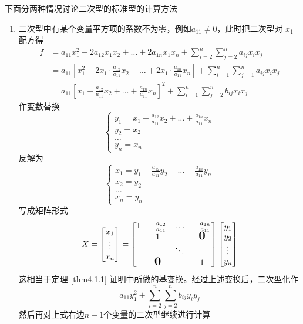 \documentclass[11pt]{article}
\begin{document}
下面分两种情况讨论二次型的标准型的计算方法
\begin{enumerate}
\item 二次型中有某个变量平方项的系数不为零，例如\(a_{11}\neq0\)，此时把二次型对
\(x_1\)配方得
\begin{align*}
f&=a_{11}x_1^2+2a_{12}x_1x_2+\dots+2a_{1n}x_1x_n+\sum_{i=2}^n\sum_{j=2}^n
a_{ij}x_ix_j\\
&=a_{11}\left[x_1^2+2x_1\cdot\frac{a_{12}}{a_{11}}x_2+\dots+
2x_1\cdot \frac{a_{1n}}{a_{11}}x_n
\right]+\sum_{i=1}^n\sum_{j=1}^na_{ij}x_ix_j\\
&=a_{11}\left[
x_1+\frac{a_{12}}{a_{11}}x_2+\dots+\frac{a_{1n}}{a_{11}}x_n
\right]^2+\sum_{i=1}^n\sum_{j=2}^nb_{ij}x_ix_j
\end{align*}
作变数替换
\begin{equation*}
\begin{cases}
y_1=x_1+\frac{a_{12}}{a_{11}}x_2+\dots+\frac{a_{1n}}{a_{11}}x_n\\
y_2=x_2\\
\dots\\
y_n=x_n
\end{cases}
\end{equation*}
反解为
\begin{equation*}
\begin{cases}
x_1=y_1-\frac{a_{12}}{a_{11}}y_2-\dots-\frac{a_{1n}}{a_{11}}y_n\\
x_2=y_2\\
\dots\\
x_n=y_n
\end{cases}
\end{equation*}
写成矩阵形式
\begin{equation*}
X=
\begin{bmatrix}
x_1\\\vdots\\x_n
\end{bmatrix}=
\begin{bmatrix}
1&-\frac{a_{12}}{a_{11}}&\dots&-\frac{a_{1n}}{a_{11}}\\
&1&&\mbox{\normalfont\Large\bfseries 0}\\
&&\ddots&\\
&\mbox{\normalfont\Large\bfseries 0}&&1
\end{bmatrix}
\begin{bmatrix}
y_1\\y_2\\\vdots\\y_n
\end{bmatrix}
\end{equation*}
这相当于定理 \ref{thm4.1.1} 证明中所做的基变换。经过上述变换后，二次型化作
\begin{equation*}
a_{11}y_1^2+\sum_{i=2}^n\sum_{j=2}^nb_{ij}y_iy_j
\end{equation*}
然后再对上式右边\(n-1\)个变量的二次型继续进行计算


\end{enumerate}
\end{document}
